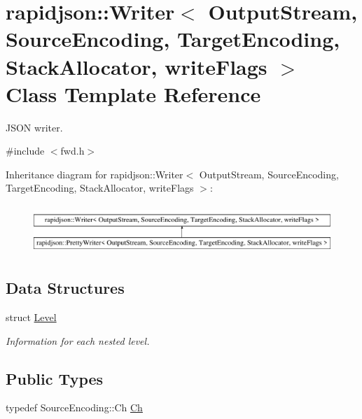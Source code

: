 \hypertarget{classrapidjson_1_1_writer}{}\section{rapidjson\+::Writer$<$ Output\+Stream, Source\+Encoding, Target\+Encoding, Stack\+Allocator, write\+Flags $>$ Class Template Reference}
\label{classrapidjson_1_1_writer}


J\+S\+ON writer.  




{\ttfamily \#include $<$fwd.\+h$>$}

Inheritance diagram for rapidjson\+::Writer$<$ Output\+Stream, Source\+Encoding, Target\+Encoding, Stack\+Allocator, write\+Flags $>$\+:\begin{figure}[H]
\begin{center}
\leavevmode
\includegraphics[height=1.854305cm]{classrapidjson_1_1_writer}
\end{center}
\end{figure}
\subsection*{Data Structures}
\begin{DoxyCompactItemize}
\item 
struct \mbox{\hyperlink{structrapidjson_1_1_writer_1_1_level}{Level}}
\begin{DoxyCompactList}\small\item\em Information for each nested level. \end{DoxyCompactList}\end{DoxyCompactItemize}
\subsection*{Public Types}
\begin{DoxyCompactItemize}
\item 
typedef Source\+Encoding\+::\+Ch \mbox{\hyperlink{classrapidjson_1_1_writer_a2cf973937ca1110293bf1350fac2a6d6}{Ch}}
\end{DoxyCompactItemize}
